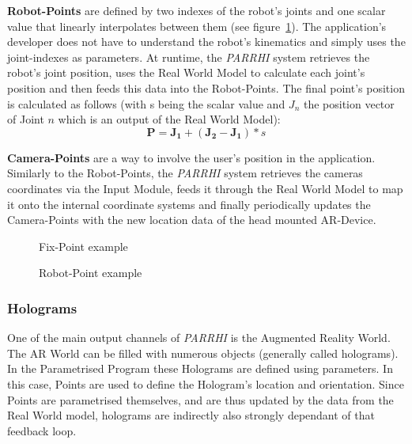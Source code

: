 \textbf{Robot-Points} are defined by two indexes of the robot's joints and one scalar value that linearly interpolates between them (see figure~\ref{InputData:PointRobot}). The application's developer does not have to understand the robot's kinematics and simply uses the joint-indexes as parameters. At runtime, the \textit{PARRHI} system retrieves the robot's joint position, uses the Real World Model to calculate each joint's position and then feeds this data into the Robot-Points. The final point's position is calculated as follows (with s being the scalar value and $J_n$ the position vector of Joint $n$ which is an output of the Real World Model):
\begin{equation}
\boldsymbol{P} = \boldsymbol{J_1} + (\boldsymbol{J_2}-\boldsymbol{J_1}) * s
\end{equation}

\textbf{Camera-Points} are a way to involve the user's position in the application. Similarly to the Robot-Points, the \textit{PARRHI} system retrieves the cameras coordinates via the Input Module, feeds it through the Real World Model to map it onto the internal coordinate systems and finally periodically updates the Camera-Points with the new location data of the head mounted AR-Device.


\begin{figure}
	\begin{minipage}{0.45\textwidth}
		\centering
		
		\caption{Fix-Point example}
		\label{InputData:PointFix}
	\end{minipage}\hfill
	\begin{minipage}{0.45\textwidth}
		\centering
		
		\caption{Robot-Point example}
		\label{InputData:PointRobot}
	\end{minipage}
\end{figure}


\subsubsection{Holograms}\label{Section:Holograms}
One of the main output channels of \textit{PARRHI} is the Augmented Reality World. The AR World can be filled with numerous objects (generally called holograms). In the Parametrised Program these Holograms are defined using parameters. In this case, Points are used to define the Hologram's location and orientation. Since Points are parametrised themselves, and are thus updated by the data from the Real World model, holograms are indirectly also strongly dependant of that feedback loop.

